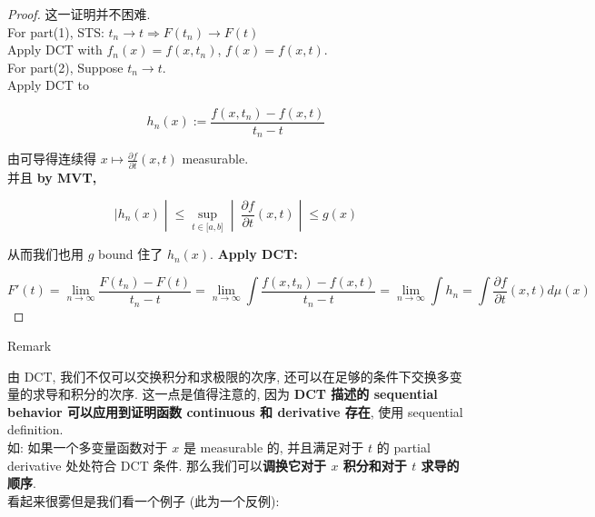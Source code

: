 \begin{proof}

这一证明并不困难.\\
For part(1), STS: \(t_{n}\rightarrow t\Longrightarrow F(t_{n})\rightarrow F(t)\)\\
Apply DCT with \(f_{n}(x) = f(x,t_{n})\), \(f(x) = f(x,t)\).\\
For part(2), Suppose \(t_{n}\rightarrow t\).\\
Apply DCT to

\[h_{n}(x) := \frac{f(x,t_{n}) - f(x,t)}{t_{n} - t}\]

由可导得连续得 \(x\mapsto\frac{\partial f}{\partial t}(x,t)\) measurable.\\
并且 \textbf{by MVT,}

\[\left. |h_{n}(x) \middle| \leq \sup\limits_{t \in \lbrack a,b\rbrack} \middle| \ \frac{\partial f}{\partial t}(x,t) \middle| \leq g(x) \right.\]

从而我们也用 \(g\) bound 住了 \(h_{n}(x)\). \textbf{Apply DCT:}

\[F'(t) = \lim\limits_{n\rightarrow\infty}\frac{F(t_{n}) - F(t)}{t_{n} - t} = \lim\limits_{n\rightarrow\infty}\int\frac{f(x,t_{n}) - f(x,t)}{t_{n} - t} = \lim\limits_{n\rightarrow\infty}\int h_{n} = \int\frac{\partial f}{\partial t}(x,t) d\mu(x)\]

\end{proof}

\begin{qlremark}{Remark}

由 DCT, 我们不仅可以交换积分和求极限的次序, 还可以在足够的条件下交换多变量的求导和积分的次序. 这一点是值得注意的, 因为 \textbf{DCT 描述的 sequential behavior 可以应用到证明函数 continuous 和 derivative 存在}, 使用 sequential definition.\\
如: 如果一个多变量函数对于 \(x\) 是 measurable 的, 并且满足对于 \(t\) 的 partial derivative 处处符合 DCT 条件. 那么我们可以\textbf{调换它对于 \(x\) 积分和对于 \(t\) 求导的顺序}.\\
看起来很雾但是我们看一个例子 (此为一个反例):

\end{qlremark}

